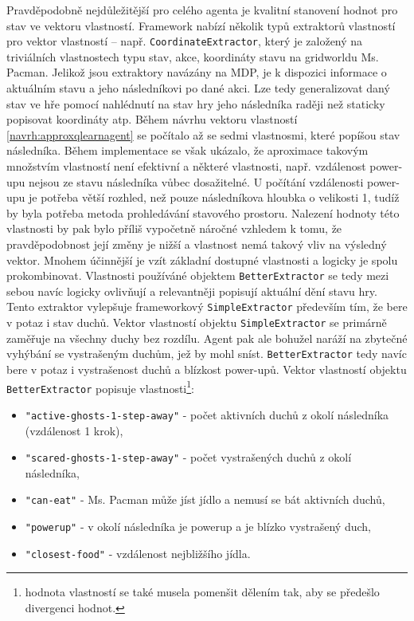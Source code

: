 Pravděpodobně nejdůležitější pro celého agenta je kvalitní stanovení hodnot pro stav ve vektoru vlastností. Framework nabízí několik typů extraktorů vlastností pro vektor vlastností -- např. \texttt{CoordinateExtractor}, který je založený na triviálních vlastnostech typu stav, akce, koordináty stavu na gridworldu Ms. Pacman. Jelikož jsou extraktory navázány na MDP, je k dispozici informace o aktuálním stavu a jeho následníkovi po dané akci. Lze tedy generalizovat daný stav ve hře pomocí nahlédnutí na stav hry jeho následníka raději než staticky popisovat koordináty atp. Během návrhu vektoru vlastností \ref{navrh:approxqlearnagent} se počítalo až se sedmi vlastnosmi, které popíšou stav následníka. Během implementace se však ukázalo, že aproximace takovým množstvím vlastností není efektivní a některé vlastnosti, např. vzdálenost power-upu nejsou ze stavu následníka vůbec dosažitelné. U počítání vzdálenosti power-upu je potřeba větší rozhled, než pouze následníkova hloubka o velikosti 1, tudíž by byla potřeba metoda prohledávání stavového prostoru. Nalezení hodnoty této vlastnosti by pak bylo příliš vypočetně náročné vzhledem k tomu, že pravděpodobnost její změny je nižší a vlastnost nemá takový vliv na výsledný vektor. Mnohem účinnější je vzít základní dostupné vlastnosti  a logicky je spolu prokombinovat. Vlastnosti používáné objektem \texttt{BetterExtractor} se tedy mezi sebou navíc logicky ovlivňují a relevantněji popisují aktuální dění stavu hry. Tento extraktor vylepšuje frameworkový \texttt{SimpleExtractor} především tím, že bere v potaz i stav duchů. Vektor vlastností objektu \texttt{SimpleExtractor} se primárně zaměřuje na všechny duchy bez rozdílu. Agent pak ale bohužel naráží na zbytečné vyhýbání se vystrašeným duchům, jež by mohl sníst. \texttt{BetterExtractor} tedy navíc bere v potaz i vystrašenost duchů a blízkost power-upů. Vektor vlastností objektu \texttt{BetterExtractor} popisuje vlastnosti\footnote{hodnota vlastností se také musela pomenšit dělením tak, aby se předešlo divergenci hodnot.}:
\begin{itemize}
\item \texttt{"active-ghosts-1-step-away"} - počet aktivních duchů z okolí následníka (vzdálenost 1 krok),
\item \texttt{"scared-ghosts-1-step-away"} - počet vystrašených duchů z okolí následníka,
\item \texttt{"can-eat"} - Ms. Pacman může jíst jídlo a nemusí se bát aktivních duchů,
\item \texttt{"powerup"} - v okolí následníka je powerup a je blízko vystrašený duch,
\item \texttt{"closest-food"} - vzdálenost nejbližšího jídla.
\end{itemize}
